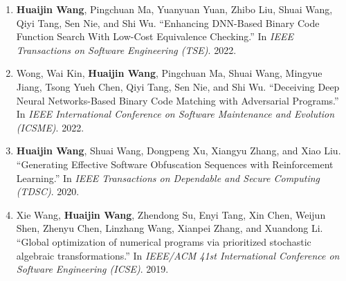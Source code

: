 \begin{enumerate}
    \item \textbf{Huaijin Wang}, Pingchuan Ma, Yuanyuan Yuan, Zhibo Liu, Shuai Wang, Qiyi Tang, Sen Nie, and Shi Wu.
    ``Enhancing DNN-Based
    Binary Code Function Search With Low-Cost Equivalence Checking.''
    In \textit{IEEE Transactions on Software Engineering (TSE)}. 2022.
    
    \item Wong, Wai Kin, \textbf{Huaijin Wang}, Pingchuan Ma, Shuai Wang, Mingyue Jiang, Tsong Yueh Chen, Qiyi Tang, Sen Nie, and Shi Wu.
    ``Deceiving Deep Neural Networks-Based Binary Code Matching with Adversarial Programs.''
    In \textit{IEEE International
    Conference on Software Maintenance and Evolution (ICSME)}. 2022.
    
    \item \textbf{Huaijin Wang}, Shuai Wang, Dongpeng Xu, Xiangyu Zhang, and Xiao Liu.
    ``Generating Effective Software Obfuscation Sequences with Reinforcement Learning.''
    In \textit{IEEE Transactions on Dependable and Secure Computing (TDSC)}. 2020.
    
    \item Xie Wang, \textbf{Huaijin Wang}, Zhendong Su, Enyi Tang, Xin Chen, Weijun Shen, Zhenyu Chen, Linzhang Wang, Xianpei Zhang, and Xuandong Li.
    ``Global optimization of numerical programs via prioritized stochastic algebraic transformations.''
    In \textit{IEEE/ACM 41st
    International Conference on Software Engineering (ICSE)}. 2019.
\end{enumerate}
